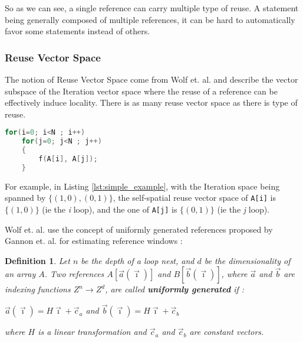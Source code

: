 \documentclass[paper=a4, fontsize=11.5pt]{scrartcl}
\newtheorem{defn}{Definition}[section]
\numberwithin{equation}{section}        %
\numberwithin{figure}{section}          %
\numberwithin{table}{section}               %
\begin{document}
                So as we can see, a single reference can carry multiple type of reuse.
                A statement being generally composed of multiple references, it 
                can be hard to automatically favor some statements instead of others.
        \subsubsection{Reuse Vector Space}
        \label{sec:wolf_91}
            The notion of Reuse Vector Space come from Wolf et. al.\cite{Wolf'91} and describe
            the vector subspace of the Iteration vector space where the reuse of
            a reference can be effectively induce locality.
            There is as many reuse vector space as there is type of reuse.

\begin{lstlisting}[frame=single, language=C, caption=Simple example, label={lst:simple_example}]
for(i=0; i<N ; i++)
    for(j=0; j<N ; j++)
    {
        f(A[i], A[j]);
    }
\end{lstlisting}

            For example, in Listing \ref{lst:simple_example}, with the Iteration
            space being spanned by $\{(1,0),(0,1)\}$, the self-spatial reuse vector space of
            \verb'A[i]' is $\{(1,0)\}$ (ie the {\it i} loop), and the one of \verb'A[j]' is $\{(0,1)\}$
            (ie the {\it j} loop).

            Wolf et. al. use the concept of uniformly generated references proposed
            by Gannon et. al.\cite{Gannon:1988:SCL:50454.50460} for estimating reference
            windows :
            \begin{defn}
            \label{sec:uniformly_generated}
                Let $n$ be the depth of a loop nest, and $d$ be the dimensionality of
                an array $A$. Two references $A[\vec{a}(\vec{\imath})]$ and
                $B[\vec{b}(\vec{\imath})]$, where $\vec{a}$ and $\vec{b}$ are indexing
                functions $Z^{n} \rightarrow Z^{d}$, are called \textbf{uniformly generated} if :
                \begin{center}
                    $\vec{a}(\vec{\imath}) = H\vec{\imath}+\vec{c}_a$ and $\vec{b}(\vec{\imath}) = H\vec{\imath}+\vec{c}_b$
                \end{center}
                where $H$ is a linear transformation and $\vec{c}_a$ and $\vec{c}_b$ are constant vectors.
            \end{defn}
            
\end{document}
